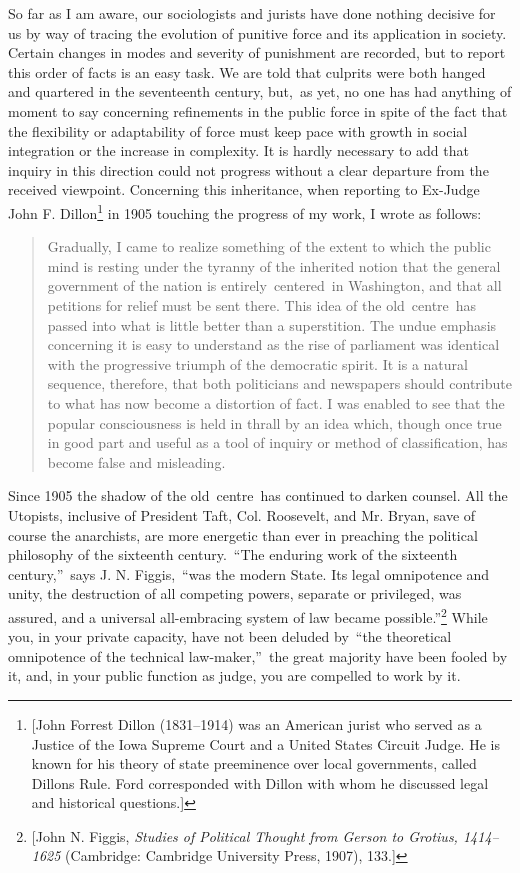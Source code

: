\documentclass[openany,nobib]{tufte-book}
\begin{document}
So far as I am aware, our sociologists and jurists have done nothing
decisive for us by way of tracing the evolution of punitive force and
its application in society. Certain changes in modes and severity of
punishment are recorded, but to report this order of facts is an easy
task. We are told that culprits were both hanged and quartered in the
seventeenth century, but,~as yet, no one has had anything of moment to
say concerning refinements in the public force in spite of the fact that
the flexibility or adaptability of force must keep pace with growth in
social integration or the increase in complexity. It is hardly necessary
to add that inquiry in this direction could not progress without a clear
departure from the received viewpoint. Concerning this inheritance, when
reporting to Ex-Judge John F. Dillon\footnote{{[}John Forrest
  Dillon (1831--1914) was an American jurist who served as a Justice of
  the Iowa Supreme Court and a United States Circuit Judge. He is known
  for his theory of state preeminence over
  local governments, called Dillon\textquotesingle s Rule. Ford
  corresponded with Dillon with whom he discussed legal and historical
  questions.{]}} in 1905 touching the progress of my work, I wrote as
follows:~

\begin{quote}
Gradually, I came to realize something of the extent to which the public
mind is resting under the tyranny of the inherited notion that the
general government of the nation is entirely~centered~in Washington, and
that all petitions for relief must be sent there. This idea of the
old~centre~has passed into what is little better than a superstition.
The undue emphasis concerning it is easy to understand as the rise of
parliament was identical with the progressive triumph of the democratic
spirit. It is a natural sequence, therefore, that both politicians and
newspapers should contribute to what has now become a distortion of
fact. I was enabled to see that the popular consciousness is held in
thrall by an idea which, though once true in good part and useful as a
tool of inquiry or method of classification, has become false and
misleading.~
\end{quote}

\noindent Since 1905 the shadow of the old~centre~has continued to darken counsel.
All the Utopists, inclusive of President Taft, Col. Roosevelt, and Mr.
Bryan, save of course the anarchists, are more energetic than ever in
preaching the political philosophy of the sixteenth century.~``The
enduring work of the sixteenth century,''~says J. N. Figgis,~``was the
modern State. Its legal omnipotence and unity, the destruction of all
competing powers, separate or privileged, was assured, and a universal
all-embracing system of law became possible.''\footnote{{[}John N.
  Figgis, \emph{Studies of Political Thought from Gerson to Grotius,
  1414--1625} (Cambridge: Cambridge University Press, 1907), 133.{]}}
While you, in your private capacity, have not been deluded by~``the
theoretical omnipotence of the technical law-maker,''~the great majority
have been fooled by it, and, in your public function as judge, you are
compelled to work by it.~
\end{document}
